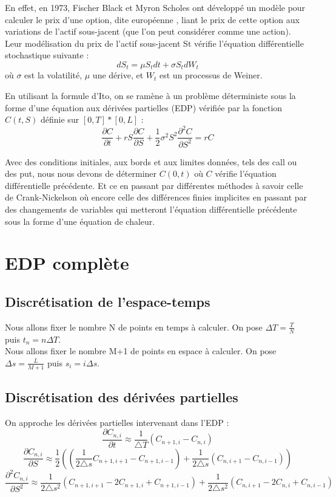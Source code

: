 \documentclass[a4paper, 12pt]{article}
\begin{document}
En effet, en 1973, Fischer Black et Myron Scholes ont développé un modèle pour calculer le prix d’une option, dite européenne , liant le prix de cette option aux variations de l’actif sous-jacent (que l’on peut considérer comme une action). Leur modélisation du prix de l’actif sous-jacent St vérifie l’équation différentielle stochastique suivante :\\
$$dS_t=\mu S_tdt+\sigma S_tdW_t$$
où $\sigma$ est la volatilité, $\mu$ une dérive, et $W_t$ est un processus de Weiner.


En utilisant la formule d’Ito, on se ramène à un problème déterministe sous la forme d’une équation aux dérivées partielles (EDP) vérifiée par la fonction $C(t,S)$ définie sur $[0,T]*[0,L]$ :\\
$$\frac{\partial C}{\partial t}+rS\frac{\partial C}{\partial S}+\frac{1}{2}\sigma^2 S^2\frac{\partial^2 C}{\partial S^2}=rC$$

Avec des conditions initiales, aux bords et aux limites données, tels des call ou des put, nous nous devons de déterminer $C(0,t)$ où $C$ vérifie l'équation différentielle précédente. Et ce en passant par différentes méthodes à savoir celle de Crank-Nickelson où encore celle des différences finies implicites en passant par des changements de variables qui metteront l'équation différentielle précédente sous la forme d'une équation de chaleur.
		
	\newpage

\newpage
\section{EDP complète}

\subsection{Discrétisation de l’espace-temps}
Nous allons fixer le nombre N de points en temps à calculer. On pose $\Delta T =  \frac{T}{N}$ puis
$t_n = n \Delta T $.\\

Nous allons fixer le nombre M+1 de points en espace à calculer. On pose $\Delta s =  \frac{L}{M+1}$ puis
$s_i = i \Delta s $.

\subsection{Discrétisation des dérivées partielles}
On approche les dérivées partielles intervenant dans l'EDP :
\[
\frac{\partial C_{n,i}}{\partial t} \approx \frac{1}{\triangle T}\left(C_{n+1,i} - C_{n,i}\right)
\]
\[
\frac{\partial C_{n,i}}{\partial S} \approx \frac{1}{2}\left((\frac{1}{2\triangle s}C_{n+1,i+1} - C_{n+1,i-1}) + \frac{1}{2\triangle s}(C_{n,i+1} - C_{n,i-1})\right)
\]
\[\frac{\partial^2 C_{n,i}}{\partial S^2} \approx \frac{1}{2\triangle s^2}(C_{n+1,i+1} - 2C_{n+1,i} + C_{n+1,i-1}) + \frac{1}{2\triangle s^2}(C_{n,i+1} - 2C_{n,i} + C_{n,i-1})\]
\end{document}

